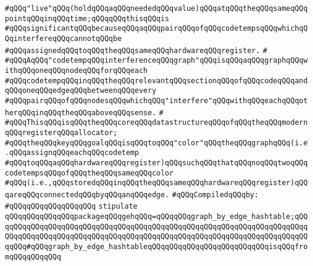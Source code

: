 \verb|#qQQq"live"qQQq(holdqQQqaqQQqneededqQQqvalue)qQQqatqQQqtheqQQqsameqQQqpointqQQqinqQQqtime;qQQqqQQqthisqQQqis|\newline
\verb|#qQQqsignificantqQQqbecauseqQQqaqQQqpairqQQqofqQQqcodetempsqQQqwhichqQQqinterfereqQQqcannotqQQqbe|\newline
\verb|#qQQqassignedqQQqtoqQQqtheqQQqsameqQQqhardwareqQQqregister.|\newline
\verb|#|\newline
\verb|#qQQqAqQQq"codetempqQQqinterferenceqQQqgraph"qQQqisqQQqaqQQqgraphqQQqwithqQQqoneqQQqnodeqQQqforqQQqeach|\newline
\verb|#qQQqcodetempqQQqinqQQqtheqQQqrelevantqQQqsectionqQQqofqQQqcodeqQQqandqQQqoneqQQqedgeqQQqbetweenqQQqevery|\newline
\verb|#qQQqpairqQQqofqQQqnodesqQQqwhichqQQq"interfere"qQQqwithqQQqeachqQQqotherqQQqinqQQqtheqQQqaboveqQQqsense.|\newline
\verb|#|\newline
\verb|#qQQqThisqQQqisqQQqtheqQQqcoreqQQqdatastructureqQQqofqQQqtheqQQqmodernqQQqregisterqQQqallocator;|\newline
\verb|#qQQqtheqQQqkeyqQQqgoalqQQqisqQQqtoqQQq"color"qQQqtheqQQqgraphqQQq(i.e.qQQqassignqQQqeachqQQqcodetemp|\newline
\verb|#qQQqtoqQQqaqQQqhardwareqQQqregister)qQQqsuchqQQqthatqQQqnoqQQqtwoqQQqcodetempsqQQqofqQQqtheqQQqsameqQQqcolor|\newline
\verb|#qQQq(i.e.,qQQqstoredqQQqinqQQqtheqQQqsameqQQqhardwareqQQqregister)qQQqareqQQqconnectedqQQqbyqQQqanqQQqedge.|\newline
\newline
\verb|#qQQqCompiledqQQqby:|\newline
\verb|#qQQqqQQqqQQqqQQqqQQq|\newline
\newline
\newline
\newline
\newline
\newline
\verb|stipulate|\newline
\verb|qQQqqQQqqQQqqQQqpackageqQQqgehqQQq=qQQqqQQqgraph_by_edge_hashtable;qQQqqQQqqQQqqQQqqQQqqQQqqQQqqQQqqQQqqQQqqQQqqQQqqQQqqQQqqQQqqQQqqQQqqQQqqQQqqQQqqQQqqQQqqQQqqQQqqQQqqQQqqQQqqQQqqQQqqQQqqQQqqQQqqQQqqQQqqQQqqQQqqQQq#qQQqgraph_by_edge_hashtableqQQqqQQqqQQqqQQqqQQqqQQqqQQqisqQQqfromqQQqqQQqqQQq|\newline
